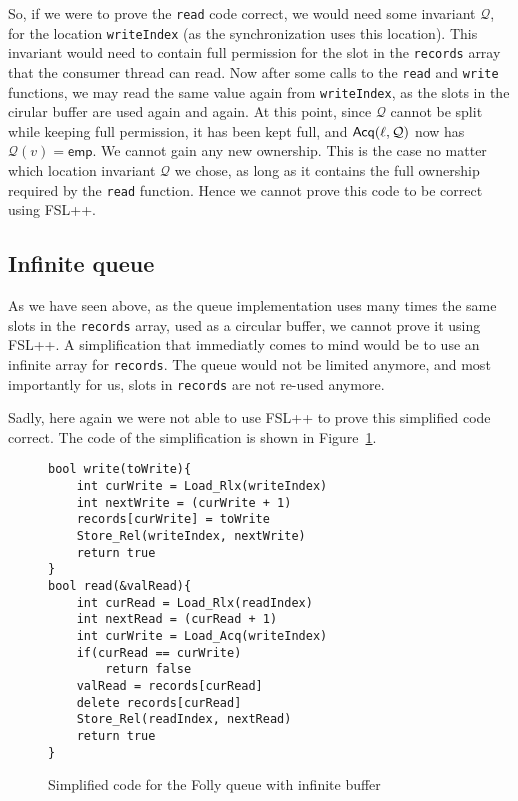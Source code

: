 So, if we were to prove the \texttt{read} code correct, we would need some invariant $\mathcal{Q}$, for the location \texttt{writeIndex} (as the synchronization uses this location). This invariant would need to contain full permission for the slot in the \texttt{records} array that the consumer thread can read. Now after some calls to the \texttt{read} and \texttt{write} functions, we may read the same value again from \texttt{writeIndex}, as the slots in the cirular buffer are used again and again. At this point, since $\mathcal{Q}$ cannot be split while keeping full permission, it has been kept full, and $\operatorname{\mathsf{Acq}}(\ell, \mathcal{Q})$ now has $\mathcal{Q}(v) = \mathsf{emp}$. We cannot gain any new ownership. This is the case no matter which location invariant $\mathcal{Q}$ we chose, as long as it contains the full ownership required by the \texttt{read} function. Hence we cannot prove this code to be correct using FSL++.

\subsection{Infinite queue}
As we have seen above, as the queue implementation uses many times the same slots in the \texttt{records} array, used as a circular buffer, we cannot prove it using FSL++. A simplification that immediatly comes to mind would be to use an infinite array for \texttt{records}. The queue would not be limited anymore, and most importantly for us, slots in \texttt{records} are not re-used anymore.

Sadly, here again we were not able to use FSL++ to prove this simplified code correct. The code of the simplification is shown in Figure~\ref{fig:queueCode}. 

\begin{figure}
\begin{lstlisting}
bool write(toWrite){
	int curWrite = Load_Rlx(writeIndex)
	int nextWrite = (curWrite + 1)
	records[curWrite] = toWrite
	Store_Rel(writeIndex, nextWrite)
	return true
}
bool read(&valRead){
	int curRead = Load_Rlx(readIndex)
	int nextRead = (curRead + 1)
	int curWrite = Load_Acq(writeIndex)
	if(curRead == curWrite)
		return false
	valRead = records[curRead]
	delete records[curRead]
	Store_Rel(readIndex, nextRead)
	return true
}

\end{lstlisting}
		\caption{Simplified code for the Folly queue with infinite buffer}
		\label{fig:queueCode}
\end{figure}



